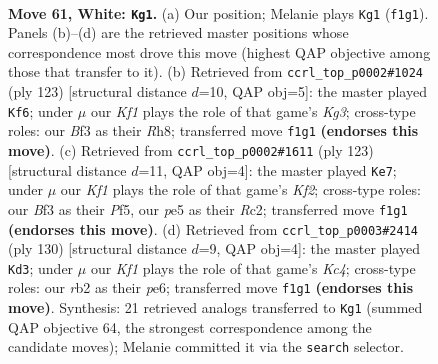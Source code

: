 \documentclass[11pt]{article}
\begin{document}
\clearpage

\begin{figure}[p]\centering
\begin{subfigure}{0.46\textwidth}\centering
\resizebox{\linewidth}{!}{%
\newchessgame
\chessboard[
  setfen={8/8/7k/4p1p1/5p2/5B2/1r6/5K2 w - - 33 61},
  showmover=false,
  pgfstyle=straightmove, color=movearrow, markmove={f1-g1}
]}
\caption{}
\end{subfigure}\hfill
\begin{subfigure}{0.46\textwidth}\centering
\resizebox{\linewidth}{!}{%
\newchessgame
\chessboard[
  setfen={7r/3R4/6k1/8/5p2/5P2/6P1/6K1 b - - 8 62},
  showmover=false,
  pgfstyle=straightmove, color=movearrow, markmove={g6-f6}
]}
\caption{}
\end{subfigure}
\\[4pt]
\begin{subfigure}{0.46\textwidth}\centering
\resizebox{\linewidth}{!}{%
\newchessgame
\chessboard[
  setfen={8/5k2/1R6/5p2/5P2/6PK/2r5/8 b - - 0 62},
  showmover=false,
  pgfstyle=straightmove, color=movearrow, markmove={f7-e7}
]}
\caption{}
\end{subfigure}\hfill
\begin{subfigure}{0.46\textwidth}\centering
\resizebox{\linewidth}{!}{%
\newchessgame
\chessboard[
  setfen={8/8/2B1p3/8/P1K2kp1/7p/8/8 w - - 0 66},
  showmover=false,
  pgfstyle=straightmove, color=movearrow, markmove={c4-d3}
]}
\caption{}
\end{subfigure}
\caption{\textbf{Move 61, White: \texttt{Kg1}.} (a) Our position; Melanie plays \texttt{Kg1} (\texttt{f1g1}). Panels (b)--(d) are the retrieved master positions whose correspondence most drove this move (highest QAP objective among those that transfer to it). (b) Retrieved from \texttt{ccrl\_top\_p0002\#1024} (ply 123) [structural distance $d$=10, QAP obj=5]: the master played \texttt{Kf6}; under $\mu$ our \emph{Kf1} plays the role of that game's \emph{Kg3}; cross-type roles: our \emph{B}f3 as their \emph{R}h8; transferred move \texttt{f1g1} \textbf{(endorses this move)}. (c) Retrieved from \texttt{ccrl\_top\_p0002\#1611} (ply 123) [structural distance $d$=11, QAP obj=4]: the master played \texttt{Ke7}; under $\mu$ our \emph{Kf1} plays the role of that game's \emph{Kf2}; cross-type roles: our \emph{B}f3 as their \emph{P}f5, our \emph{p}e5 as their \emph{R}c2; transferred move \texttt{f1g1} \textbf{(endorses this move)}. (d) Retrieved from \texttt{ccrl\_top\_p0003\#2414} (ply 130) [structural distance $d$=9, QAP obj=4]: the master played \texttt{Kd3}; under $\mu$ our \emph{Kf1} plays the role of that game's \emph{Kc4}; cross-type roles: our \emph{r}b2 as their \emph{p}e6; transferred move \texttt{f1g1} \textbf{(endorses this move)}. Synthesis: 21 retrieved analogs transferred to \texttt{Kg1} (summed QAP objective 64, the strongest correspondence among the candidate moves); Melanie committed it via the \texttt{search} selector.}
\label{fig:thought-m120}
\end{figure}
\end{document}
